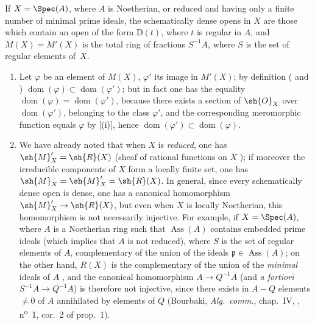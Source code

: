 \begin{corollary}[20.2.12]
\label{IV.20.2.12}
If $X=\Spec(A)$, where $A$ is Noetherian, or reduced and having only a finite number of minimal prime ideals, the schematically dense opens in $X$ are those which contain an open of the form $\mathrm{D}(t)$, where $t$ is regular in $A$, and $M(X)=M'(X)$ is the total ring of fractions $S^{-1}A$, where $S$ is the set of regular elements of~$X$.
\end{corollary}

\begin{remarks}[20.2.13]
\label{IV.20.2.13}
\begin{enumerate}[label=(\roman*)]
  \item Let $\varphi$ be an element of $M(X)$, $\varphi'$ its image in $M'(X)$;
  by definition ( and ) $\operatorname{dom}(\varphi)\subset\operatorname{dom}(\varphi')$;
  but in fact one has the equality $\operatorname{dom}(\varphi)=\operatorname{dom}(\varphi')$, because there exists a section of $\sh{O}_X$ over $\operatorname{dom}(\varphi')$, belonging to the class $\varphi'$, and the corresponding meromorphic function equals $\varphi$ by [(i)], hence $\operatorname{dom}(\varphi')\subset\operatorname{dom}(\varphi)$.

  \item We have already noted that when $X$ is \emph{reduced}, one has $\sh{M}'_X=\sh{R}(X)$ (sheaf of rational functions on $X$ );
  if moreover the irreducible components of $X$ form a locally finite set, one has $\sh{M}_X=\sh{M}'_X=\sh{R}(X)$.
  In general, since every schematically dense open is dense, one has a canonical homomorphism $\sh{M}'_X\to\sh{R}(X)$, but even when $X$ is locally Noetherian, this homomorphism is not necessarily injective.
  For example, if $X=\Spec(A)$, where $A$ is a Noetherian ring such that $\operatorname{Ass}(A)$ contains embedded prime ideals (which implies that $A$ is not reduced),
  where $S$ is the set of regular elements of $A$, complementary of the union of the ideals $\mathfrak{p}\in\operatorname{Ass}(A)$;
  on the other hand, $R(X)$ is the complementary of the union of the \emph{minimal} ideals of $A$ , and the canonical homomorphism $A\to Q^{-1}A$ (and \emph{a fortiori} $S^{-1}A\to Q^{-1}A$) is therefore not injective, since there exists in $A-Q$ elements $\neq 0$ of $A$ annihilated by elements of $Q$ (Bourbaki, \emph{Alg.~comm.}, chap.~IV, , n\textsuperscript{o}~1, cor.~2 of prop.~1).


\end{enumerate}
\end{remarks}
